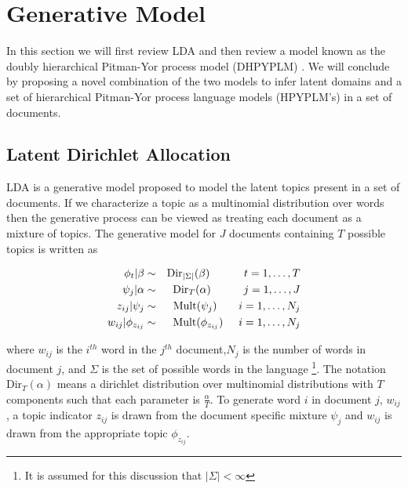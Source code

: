 \section{Generative Model}

\newcommand{\G}{\mathcal{G}}
\newcommand{\LM}{\mathcal{L}\mathcal{M}}
\newcommand{\bu}{{\bf u}}
\newcommand{\PY}{\mathcal{P}\mathcal{Y}}
\newcommand{\D}{\mathcal{D}}
\newcommand{\LA}{\mathcal{L}}

In this section we will first review LDA and then review a model known as the doubly hierarchical Pitman-Yor process model (DHPYPLM) \cite{wood and teh}. We will conclude by proposing a novel combination of the two models to infer latent domains and a set of hierarchical Pitman-Yor process language models (HPYPLM's) \cite{teh} in a set of documents.

\subsection{Latent Dirichlet Allocation}

LDA \cite{Blei and Jordan} is a generative model proposed to model the latent topics present in a set of documents.  If we characterize a topic as a multinomial distribution over words then the generative process can be viewed as treating each document as a mixture of topics. The generative model for $J$ documents containing $T$ possible topics is written as 

\begin{eqnarray}
\phi_t | \beta  &\sim& \textrm{Dir}_{|\Sigma|}(\beta)  \hspace{1.1cm} t = 1,\ldots,T \nonumber \\
\psi_j | \alpha &\sim& \textrm{Dir}_T(\alpha) \hspace{1.05cm} j = 1,\ldots, J\nonumber \\
z_{ij} | \psi_j &\sim& \textrm{Mult}(\psi_j) \hspace{.7cm} i = 1,\ldots, N_j \nonumber \\
w_{ij} | \phi_{z_{ij}} &\sim& \textrm{Mult}(\phi_{z_{ij}}) \hspace{.5cm} i = 1,\ldots, N_j 
\end{eqnarray}

where $w_{ij}$ is the $i^{th}$ word in the $j^{th}$ document,$N_j$ is the number of words in document $j$, and $\Sigma$ is the set of possible words in the language \footnote{It is assumed for this discussion that $| \Sigma| < \infty$}. The notation $\textrm{Dir}_T(\alpha)$ means a dirichlet distribution over multinomial distributions with $T$ components such that each parameter is $\frac{\alpha}{T}$.  To generate word $i$ in document $j$, $w_{ij}$, a topic indicator $z_{ij}$ is drawn from the document specific mixture $\psi_j$ and $w_{ij}$ is drawn from the appropriate topic $\phi_{z_{ij}}$. 


